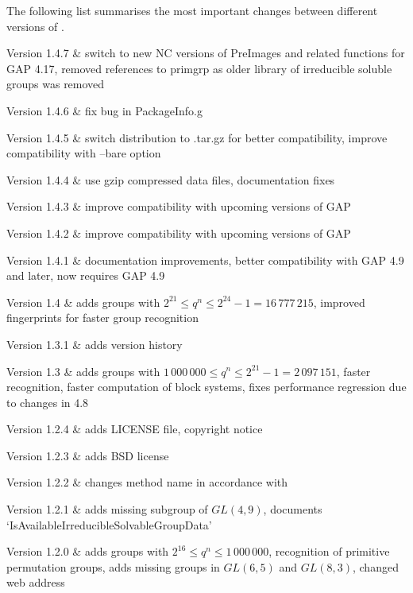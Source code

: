 
The following list summarises the most important changes between different versions of \IRREDSOL.

\beginitems
Version 1.4.7 &
	switch to new NC versions of PreImages and related functions for GAP 4.17, removed references to primgrp as older library of irreducible soluble groups was removed
	
Version 1.4.6 &
	fix bug in PackageInfo.g
	
Version 1.4.5 &
	switch distribution to .tar.gz for better compatibility,  improve compatibility with --bare option
	
Version 1.4.4 &
	use gzip compressed data files, documentation fixes
	
Version 1.4.3 &
	improve compatibility with upcoming versions of GAP
	
Version 1.4.2 &
	improve compatibility with upcoming versions of GAP

Version 1.4.1 &
	documentation improvements, better compatibility with GAP 4.9 and later, now requires GAP 4.9

Version 1.4 &
	adds groups with $2^{21} \leq q^n \leq 2^{24} - 1 = 16\,777\,215$, improved fingerprints for faster
	group recognition

Version 1.3.1 &
	adds version history
	
Version 1.3 &
	adds groups with $1\,000\,000 \leq q^n \leq 2^{21} - 1 = 2\,097\,151$, faster recognition, faster computation of block systems, fixes performance regression due to changes in {\GAP} 4.8
	
Version 1.2.4 &
	adds LICENSE file, copyright notice
	
Version 1.2.3 & 
	adds BSD license
	
Version 1.2.2 &
	changes method name in accordance with {\GAP}
	
Version 1.2.1 &
	adds missing subgroup of $GL(4,9)$, documents `IsAvailableIrreducibleSolvableGroupData'
	
Version 1.2.0 &
	adds groups with $2^{16} \leq q^n \leq 1\,000\,000$, recognition of primitive permutation groups, adds missing groups in $GL(6,5)$ and $GL(8,3)$, changed web address

